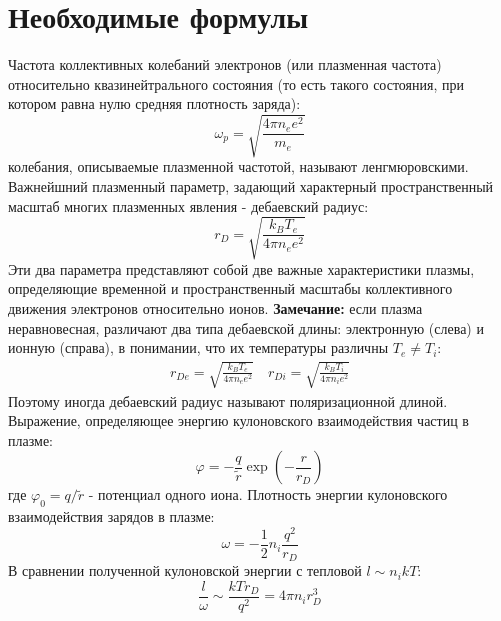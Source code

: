 \documentclass[a4paper, 12pt]{article}
\begin{document}
\section*{Необходимые формулы}
Частота коллективных колебаний электронов (или плазменная частота) относительно квазинейтрального состояния (то есть такого состояния, при котором равна нулю средняя
плотность заряда):
\begin{equation}
    \omega_{p} = \sqrt{\frac{4\pi n_{e}e^{2}}{m_{e}}}
    \label{частота коллективных колебаний}
\end{equation}
колебания, описываемые плазменной частотой, называют ленгмюровскими.\newline
Важнейшний плазменный параметр, задающий характерный пространственный масштаб многих плазменных явления - дебаевский радиус:
\begin{equation}
    r_{D} = \sqrt{\frac{k_{B}T_{e}}{4\pi n_{e}e^{2}}}
    \label{дебаевский радиус основной}
\end{equation}
Эти два  параметра представляют собой две важные характеристики плазмы, определяющие временной и пространственный масштабы коллективного
движения электронов относительно ионов.
\textbf{Замечание:} если плазма неравновесная, различают два типа дебаевской длины: электронную (слева) и ионную (справа),
в понимании, что их температуры различны $T_{e} \neq T_{i}$:
\begin{align}
    r_{De} = \sqrt{\frac{k_{B}T_{e}}{4\pi n_{e}e^{2}}} \quad r_{Di} = \sqrt{\frac{k_{B}T_{i}}{4\pi n_{i}e^{2}}}
\end{align}
Поэтому иногда дебаевский радиус называют поляризационной длиной.\newline
Выражение, определяющее энергию кулоновского взаимодействия частиц в плазме:
\begin{equation}
    \varphi = -\frac{q}{\tilde{r}}\exp\left(-\frac{r}{r_{D}}\right)
    \label{энергия кулоновского взаимодействия}
\end{equation}
где $\varphi_{0} = q/\tilde{r}$ - потенциал одного иона.\newline
Плотность энергии кулоновского взаимодействия зарядов в плазме:
\begin{equation}
    \omega = -\frac{1}{2}n_{i}\frac{q^2}{r_{D}}
    \label{плотность энергии кулоновского взаимодействия}
\end{equation}
В сравнении полученной кулоновской энергии с тепловой $l \sim n_{i}kT$:
\begin{equation}
    \frac{l}{\omega} \sim \frac{kTr_{D}}{q^2} = 4\pi n_{i}r^3_{D}
    \label{отношение энергий}
\end{equation}
\end{document}
